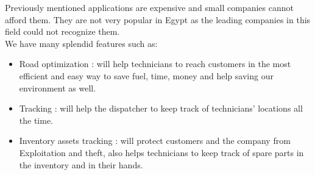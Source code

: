 Previously mentioned applications are expensive and small companies cannot afford them. They are not very popular in Egypt as the leading companies in this field could not recognize them.\\
We have many splendid features such as: 
\begin{itemize}
	\item Road optimization : will help technicians to reach customers in the most efficient and easy way to save fuel, time, money and help saving our environment as well.
	\item Tracking : will help the dispatcher to keep track of technicians' locations all the time.
	\item Inventory assets tracking : will protect customers and the company from Exploitation and theft, also helps technicians to keep track of spare parts in the inventory and in their hands.
\end{itemize}



